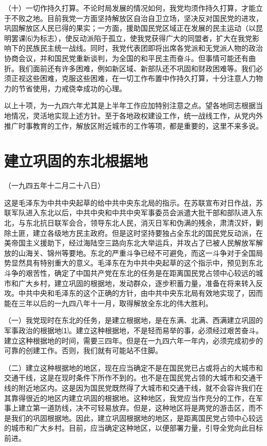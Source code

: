 \documentclass[UTF-8, a5paper, 12pt]{ctexart}
\begin{document}
（十）一切作持久打算。不论时局发展的情况如何，我党均须作持久打算，才能立于不败之地。目前我党一方面坚持解放区自治自卫立场，坚决反对国民党的进攻，巩固解放区人民已得的果实；一方面，援助国民党区域正在发展的民主运动（以昆明罢课⑹为标志），使反动派陷于孤立，使我党获得广大的同盟者，扩大在我党影响下的民族民主统一战线。同时，我党代表团即将出席各党派和无党派人物的政治协商会议，并和国民党重新谈判，为全国的和平民主而奋斗。但事情可能还有曲折。我们面前还有许多困难，例如新区域、新部队还不巩固和财政困难等。我们必须正视这些困难，克服这些困难，在一切工作布置中作持久打算，十分注意人力物力的节省使用，力戒侥幸成功的心理。

以上十项，为一九四六年尤其是上半年工作应加特别注意之点。望各地同志根据当地情况，灵活地实现上述方针。至于各地政权建设工作，统一战线工作，从党内外推广时事教育的工作，解放区附近城市的工作等项，都是重要的，这里不来多说。

\section{建立巩固的东北根据地}

（一九四五年十二月二十八日）

这是毛泽东为中共中央起草的给中共中央东北局的指示。在苏联宣布对日作战，苏联军队进入东北以后，中共中央和中共中央军事委员会派遣大批干部和部队进入东北，与东北抗日联军会合，领导东北人民，消灭日军和伪满的残余，肃清汉奸，剿除土匪，建立各级地方民主政府。但是这时坚持要独占全东北的国民党反动派，在美帝国主义援助下，经过海陆空三路向东北大举运兵，并攻占了已被人民解放军解放的山海关、锦州等要地。东北的严重斗争已经不可避免，而这一斗争对于全国局势显然具有特别重大的意义。毛泽东在为中共中央起草的这个指示中，预见到东北斗争的艰苦性，确定了中国共产党在东北的任务是在距离国民党占领中心较远的城市和广大乡村，建立巩固的根据地，发动群众，逐步积蓄力量，准备在将来转入反攻。中共中央和毛泽东的这个正确的方针，由中共中央东北局有效地实现了，因而能在三年以后的一九四八年十一月，取得解放全东北的伟大胜利。

（一）我党现时在东北的任务，是建立根据地，是在东满、北满、西满建立巩固的军事政治的根据地⑴。建立这种根据地，不是轻而易举的事，必须经过艰苦奋斗。建立这种根据地的时间，需要三四年。但是在一九四六年一年内，必须完成初步的可靠的创建工作。否则，我们就有可能站不住脚。

（二）建立这种根据地的地区，现在应当确定不是在国民党已占或将占的大城市和交通干线，这是在现时条件下所作不到的。也不是在国民党占领的大城市和交通干线的附近地区内。这是因为国民党既然得了大城市和交通干线，就不会容许我们在其靠得很近的地区内建立巩固的根据地。这种地区，我党应当作充分的工作，在军事上建立第一道防线，决不可轻易放弃。但是，这种地区将是两党的游击区，而不是我们的巩固根据地。因此，建立巩固根据地的地区，是距离国民党占领中心较远的城市和广大乡村。目前，应当确定这种地区，以便部署力量，引导全党向此目标前进。
\end{document}
